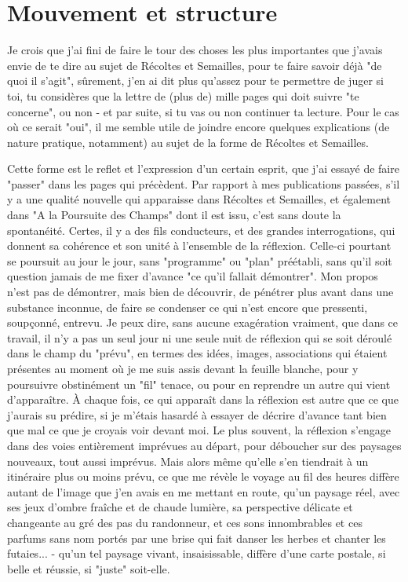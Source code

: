 \section{Mouvement et structure}

Je crois que j'ai fini de faire le tour des choses les plus importantes que j'avais envie de te dire au sujet de Récoltes et Semailles, pour te faire savoir déjà "de quoi il s'agit", sûrement, j'en ai dit plus qu'assez pour te permettre de juger si toi, tu considères que la lettre de (plus de) mille pages qui doit suivre "te concerne", ou non - et par suite, si tu vas ou non continuer ta lecture. Pour le cas où ce serait "oui", il me semble utile de joindre encore quelques explications (de nature pratique, notamment) au sujet de la forme de Récoltes et Semailles.

Cette forme est le reflet et l'expression d'un certain esprit, que j'ai essayé de faire "passer" dans les pages qui précèdent. Par rapport à mes publications passées, s'il y a une qualité nouvelle qui apparaisse dans Récoltes et Semailles, et également dans "A la Poursuite des Champs" dont il est issu, c'est sans doute la spontanéité. Certes, il y a des fils conducteurs, et des grandes interrogations, qui donnent sa cohérence et son unité à l'ensemble de la réflexion. Celle-ci pourtant se poursuit au jour le jour, sans "programme" ou "plan" préétabli, sans qu'il soit question jamais de me fixer d'avance "ce qu'il fallait démontrer". Mon propos n'est pas de démontrer, mais bien de découvrir, de pénétrer plus avant dans une substance inconnue, de faire se condenser ce qui n'est encore que pressenti, soupçonné, entrevu. Je peux dire, sans aucune exagération vraiment, que dans ce travail, il n'y a pas un seul jour ni une seule nuit de réflexion qui se soit déroulé dans le champ du "prévu", en termes des idées, images, associations qui étaient présentes au moment où je me suis assis devant la feuille blanche, pour y poursuivre obstinément un "fil" tenace, ou pour en reprendre un autre qui vient d'apparaître. À chaque fois, ce qui apparaît dans la réflexion est autre que ce que j'aurais su prédire, si je m'étais hasardé à essayer de décrire d'avance tant bien que mal ce que je croyais voir devant moi. Le plus souvent, la réflexion s'engage dans des voies entièrement imprévues au départ, pour déboucher sur des paysages nouveaux, tout aussi imprévus. Mais alors même qu'elle s'en tiendrait à un itinéraire plus ou moins prévu, ce que me révèle le voyage au fil des heures diffère autant de l'image que j'en avais en me mettant en route, qu'un paysage réel, avec ses jeux d'ombre fraîche et de chaude lumière, sa perspective délicate et changeante au gré des pas du randonneur, et ces sons innombrables et ces parfums sans nom portés par une brise qui fait danser les herbes et chanter les futaies... - qu'un tel paysage vivant, insaisissable, diffère d'une carte postale, si belle et réussie, si "juste" soit-elle.

